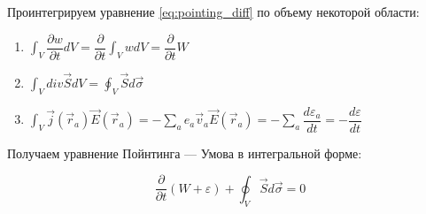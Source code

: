 \documentclass{article}
\begin{document}
Проинтегрируем уравнение \eqref{eq:pointing_diff} по объему некоторой области:

\begin{enumerate}
    \item 
    $\int_V\dfrac{\partial w}{\partial t}dV=\dfrac{\partial}{\partial t}\int_V wdV=\dfrac{\partial}{\partial t}W$
    \item
    $\int_V div\vec{S}dV=\oint_V \vec{S}d\vec{\sigma}$
    \item
    $\int_V \vec{j}(\vec{r}_a)\vec{E}(\vec{r}_a)=-\sum_a e_a \vec{v}_a \vec{E}(\vec{r}_a)=-\sum_a\dfrac{d\varepsilon_a}{dt}=-\dfrac{d\varepsilon}{dt}$
\end{enumerate}

Получаем уравнение Пойнтинга --- Умова в интегральной форме:

\begin{equation}\label{eq:pointing_int}
    \frac{\partial}{\partial t}\left(W+\varepsilon\right)+\oint_V \vec{S}d\vec{\sigma}=0
\end{equation}
\end{document}
